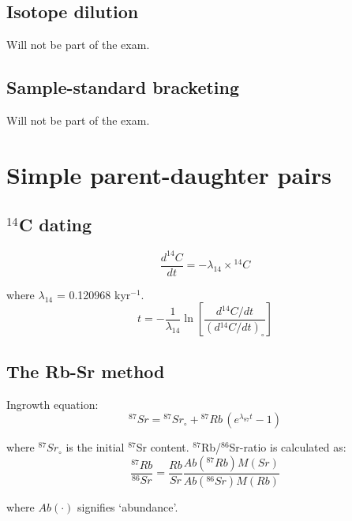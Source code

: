 \documentclass{article}
\begin{document}
\begin{multicols}{3}
\subsection{Isotope dilution}
\label{sec:isotope-dilution}

Will not be part of the exam.

\subsection{Sample-standard bracketing}
\label{sec:bracketing}

Will not be part of the exam.

\section{Simple parent-daughter pairs}
\label{ch:intro2PD}

\subsection{$^{14}$C dating}
\label{sec:14C}

\begin{equation}
\frac{d^{14}C}{dt} = -\lambda_{14} \times {}^{14}C
\label{eq:d14Cdt}
\end{equation}

where $\lambda_{14}$ = 0.120968 kyr$^{-1}$.
\begin{equation}
t = -\frac{1}{\lambda_{14}}
\ln\left[\frac{d{}^{14}C/dt}{(d{}^{14}C/dt)_\circ}\right]
\label{eq:t14C}
\end{equation}

\subsection{The Rb-Sr method}
\label{sec:Rb-Sr}

Ingrowth equation:
\begin{equation}
{}^{87}Sr = {}^{87}Sr_\circ + {}^{87}Rb \, (e^{\lambda_{87} t} - 1)
\label{eq:87Sr*}
\end{equation}

where $^{87}Sr_\circ$ is the initial $^{87}$Sr content.
$^{87}$Rb/$^{86}$Sr-ratio is calculated as:
\begin{equation}
\frac{^{87}Rb}{^{86}Sr} =
\frac{Rb}{Sr} \frac{Ab(^{87}Rb)
  M(Sr)}{Ab(^{86}Sr) M(Rb)}
\label{eq:87Rb86Sr}
\end{equation}

where $Ab(\cdot)$ signifies `abundance'.


\end{multicols}
\end{document}
